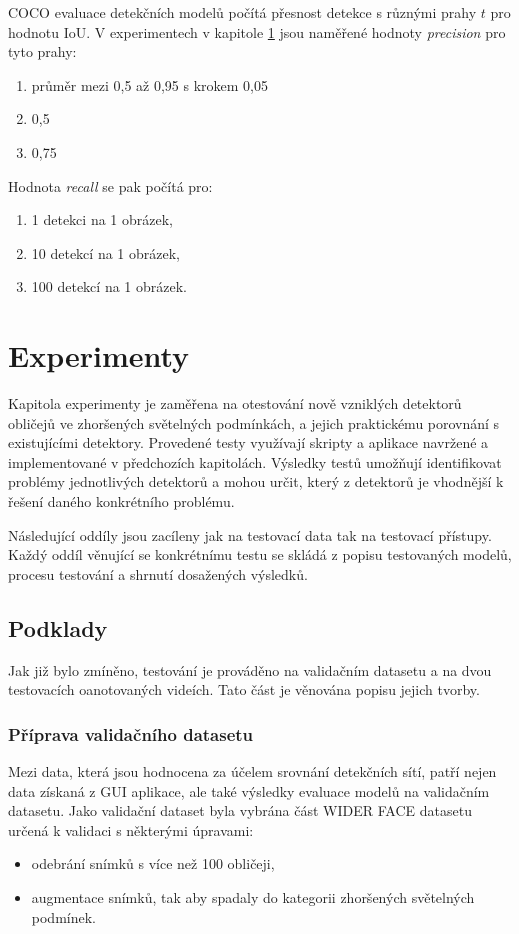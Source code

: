 COCO evaluace detekčních modelů počítá přesnost detekce s různými prahy $t$ pro hodnotu IoU. V experimentech v kapitole \ref{kapitola:experimenty} jsou naměřené hodnoty \emph{precision} pro tyto prahy:

\begin{enumerate}
  \item průměr mezi 0,5 až 0,95 s krokem 0,05
  \item 0,5
  \item 0,75
\end{enumerate}

\noindent Hodnota \emph{recall} se pak počítá pro:

\begin{enumerate}
  \item 1 detekci na 1 obrázek,
  \item 10 detekcí na 1 obrázek,
  \item 100 detekcí na 1 obrázek.
\end{enumerate}
 

\chapter{Experimenty}
\label{kapitola:experimenty}
Kapitola experimenty je zaměřena na otestování nově vzniklých detektorů obličejů ve zhoršených světelných podmínkách, a jejich praktickému porovnání s existujícími detektory. Provedené testy využívají skripty a aplikace navržené a implementované v předchozích kapitolách. Výsledky testů umožňují identifikovat problémy jednotlivých detektorů a mohou určit, který z detektorů je vhodnější k řešení daného konkrétního problému.

Následující oddíly jsou zacíleny jak na testovací data tak na testovací přístupy. Každý oddíl věnující se konkrétnímu testu se skládá z popisu testovaných modelů, procesu testování a shrnutí dosažených výsledků.

\section{Podklady}
\label{sekce:podklady}
Jak již bylo zmíněno, testování je prováděno na validačním datasetu a na dvou testovacích oanotovaných videích. Tato část je věnována popisu jejich tvorby.

\subsection*{Příprava validačního datasetu}
Mezi data, která jsou hodnocena za účelem srovnání detekčních sítí, patří nejen data získaná z GUI aplikace, ale také výsledky evaluace modelů na validačním datasetu. Jako validační dataset byla vybrána část WIDER FACE datasetu určená k validaci s některými úpravami:
\begin{itemize}
  \item odebrání snímků s více než 100 obličeji,
  \item augmentace snímků, tak aby spadaly do kategorii zhoršených světelných podmínek.
\end{itemize}

